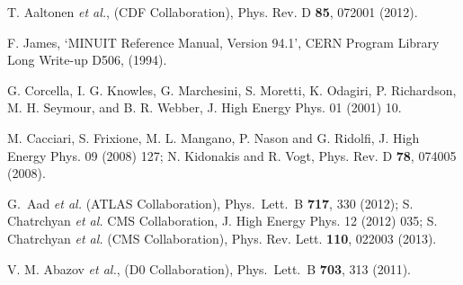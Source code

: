 \documentclass[aps,prd,twocolumn,superscriptaddress,showpacs]{revtex4}
\begin{document}
\begin{thebibliography}{150}
 T. Aaltonen {\it et al.}, (CDF Collaboration), Phys. Rev. D \textbf{85}, 072001 (2012).

 F. James, `MINUIT Reference Manual, 
Version 94.1', CERN Program Library Long Write-up D506, (1994).
 

 G. Corcella, I. G. Knowles, G. Marchesini, S. Moretti, K. Odagiri, P. Richardson, M. H. Seymour, 
and B. R. Webber,  J. High Energy Phys. 01 (2001) 10.

 M. Cacciari, S. Frixione, M. L. Mangano, P. Nason and G. Ridolfi, 
J. High Energy Phys.  09 (2008) 127; 
N. Kidonakis  and R. Vogt, Phys. Rev. D \textbf{78}, 074005 (2008).

 G.~Aad {\it et al.} (ATLAS Collaboration), Phys.~Lett.~B \textbf{717}, 330 (2012);
 S. Chatrchyan {\it et al.} CMS Collaboration,  J. High Energy Phys. 12 (2012) 035; S. Chatrchyan {\it et al.} 
(CMS Collaboration), Phys. Rev. Lett. \textbf{110}, 022003 (2013).

 V. M. Abazov {\it et al.}, (D0 Collaboration), Phys.~Lett.~B \textbf{703}, 313 (2011). 

\end{thebibliography}
\end{document}
